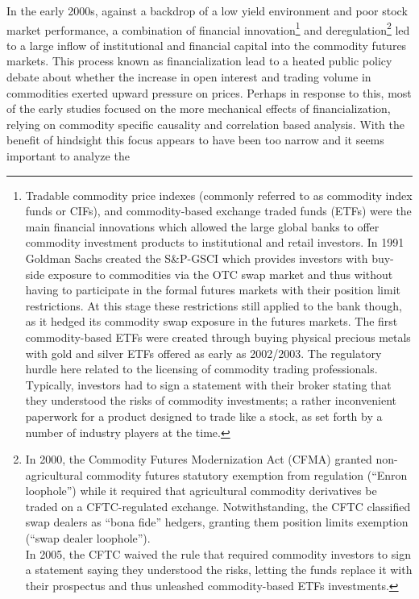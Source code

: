 \documentclass[]{elsarticle} %
\begin{document}
In the early 2000s, against a backdrop of a low yield environment and
poor stock market performance, a combination of financial
innovation\footnote{Tradable commodity price indexes (commonly referred
  to as commodity index funds or CIFs), and commodity-based exchange
  traded funds (ETFs) were the main financial innovations which allowed
  the large global banks to offer commodity investment products to
  institutional and retail investors. In 1991 Goldman Sachs created the
  S\&P-GSCI which provides investors with buy-side exposure to
  commodities via the OTC swap market and thus without having to
  participate in the formal futures markets with their position limit
  restrictions. At this stage these restrictions still applied to the
  bank though, as it hedged its commodity swap exposure in the futures
  markets. The first commodity-based ETFs were created through buying
  physical precious metals with gold and silver ETFs offered as early as
  2002/2003. The regulatory hurdle here related to the licensing of
  commodity trading professionals. Typically, investors had to sign a
  statement with their broker stating that they understood the risks of
  commodity investments; a rather inconvenient paperwork for a product
  designed to trade like a stock, as set forth by a number of industry
  players at the time.} and deregulation\footnote{In 2000, the Commodity
  Futures Modernization Act (CFMA) granted non-agricultural commodity
  futures statutory exemption from regulation (``Enron loophole'') while
  it required that agricultural commodity derivatives be traded on a
  CFTC-regulated exchange. Notwithstanding, the CFTC classified swap
  dealers as ``bona fide'' hedgers, granting them position limits
  exemption (``swap dealer loophole'').\\
  In 2005, the CFTC waived the rule that required commodity investors to
  sign a statement saying they understood the risks, letting the funds
  replace it with their prospectus and thus unleashed commodity-based
  ETFs investments.} led to a large inflow of institutional and
financial capital into the commodity futures markets. This process known
as financialization lead to a heated public policy debate about whether
the increase in open interest and trading volume in commodities exerted
upward pressure on prices. Perhaps in response to this, most of the
early studies focused on the more mechanical effects of
financialization, relying on commodity specific causality and
correlation based analysis. With the benefit of hindsight this focus
appears to have been too narrow and it seems important to analyze the
\end{document}
